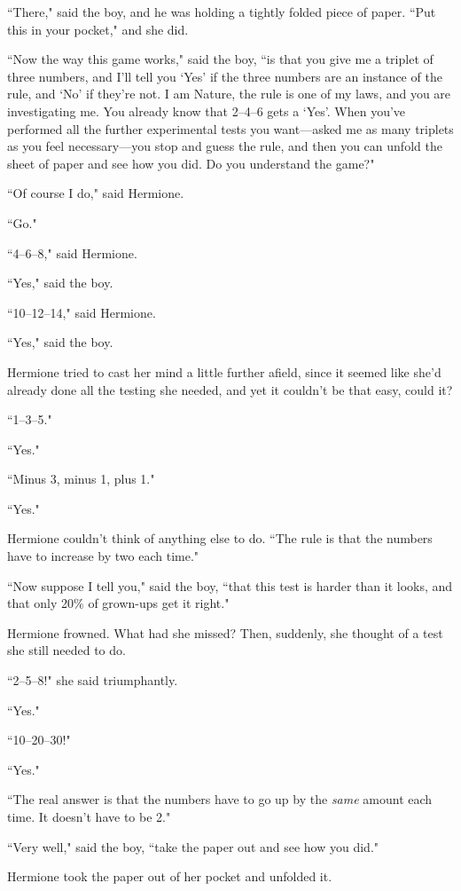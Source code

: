 ``There," said the boy, and he was holding a tightly folded piece of paper. ``Put this in your pocket," and she did.

``Now the way this game works," said the boy, ``is that you give me a triplet of three numbers, and I'll tell you `Yes' if the three numbers are an instance of the rule, and `No' if they're not. I am Nature, the rule is one of my laws, and you are investigating me. You already know that 2--4--6 gets a `Yes'. When you've performed all the further experimental tests you want---asked me as many triplets as you feel necessary---you stop and guess the rule, and then you can unfold the sheet of paper and see how you did. Do you understand the game?"

``Of course I do," said Hermione.

``Go."

``4--6--8," said Hermione.

``Yes," said the boy.

``10--12--14," said Hermione.

``Yes," said the boy.

Hermione tried to cast her mind a little further afield, since it seemed like she'd already done all the testing she needed, and yet it couldn't be that easy, could it?

``1--3--5."

``Yes."

``Minus 3, minus 1, plus 1."

``Yes."

Hermione couldn't think of anything else to do. ``The rule is that the numbers have to increase by two each time."

``Now suppose I tell you," said the boy, ``that this test is harder than it looks, and that only 20\% of grown-ups get it right."

Hermione frowned. What had she missed? Then, suddenly, she thought of a test she still needed to do.

``2--5--8!" she said triumphantly.

``Yes."

``10--20--30!"

``Yes."

``The real answer is that the numbers have to go up by the \emph{same} amount each time. It doesn't have to be 2."

``Very well," said the boy, ``take the paper out and see how you did."

Hermione took the paper out of her pocket and unfolded it.

